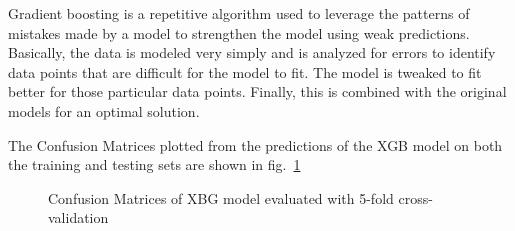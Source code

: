 \documentclass[runningheads]{llncs}
\makeatletter
\let\oldparagraph\paragraph
\renewcommand\paragraph{\@ifstar{\oldparagraph}{\oldparagraph*}}
\makeatother
\begin{document}
\hypertarget{gradient-boosting}{%
\paragraph{Gradient Boosting}\label{gradient-boosting}}

Gradient boosting is a repetitive algorithm used to leverage the
patterns of mistakes made by a model to strengthen the model using weak
predictions. Basically, the data is modeled very simply and is analyzed
for errors to identify data points that are difficult for the model to
fit. The model is tweaked to fit better for those particular data
points. Finally, this is combined with the original models for an
optimal solution.

The Confusion Matrices plotted from the predictions of the XGB model on
both the training and testing sets are shown in fig.~\ref{fig:xgb_cf}

\begin{figure}
\centering


\caption{Confusion Matrices of XBG model evaluated with 5-fold
cross-validation}

\label{fig:xgb_cf}

\end{figure}
\end{document}
